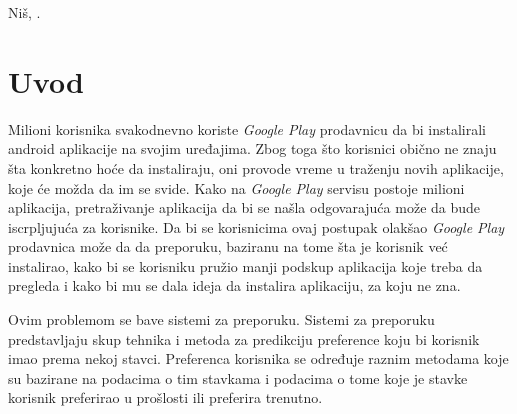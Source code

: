 \documentclass[a4paper,12pt,titlepage]{article}
\begin{document}
\begin{titlepage}
   
  
    
    
     \begin{center}
        Niš, \the\year.
    \end{center}
\end{titlepage}

\tableofcontents

\setlength{\parskip}{\baselineskip}%
\setlength{\parindent}{15pt}%

\thispagestyle{empty}
\newpage


\section{Uvod}%

Milioni korisnika svakodnevno koriste \emph{Google Play} prodavnicu da bi instalirali android aplikacije na svojim uređajima. Zbog toga što korisnici obično ne znaju šta konkretno hoće da instaliraju, oni provode vreme u traženju novih aplikacije, koje će možda da im se svide. Kako na \emph{Google Play} servisu postoje milioni aplikacija, pretraživanje aplikacija da bi se našla odgovarajuća može da bude iscrpljujuća za korisnike. Da bi se korisnicima ovaj postupak olakšao \emph{Google Play} prodavnica može da da preporuku, baziranu na tome šta je korisnik već instalirao, kako bi se korisniku pružio manji podskup aplikacija koje treba da pregleda i kako bi mu se dala ideja da instalira aplikaciju, za koju ne zna.

Ovim problemom se bave sistemi za preporuku. Sistemi za preporuku predstavljaju skup tehnika i metoda za predikciju preference koju bi korisnik imao prema nekoj stavci. Preferenca korisnika se određuje raznim metodama koje su bazirane na podacima o tim stavkama i podacima o tome koje je stavke korisnik preferirao u prošlosti ili preferira trenutno. 
\end{document}
